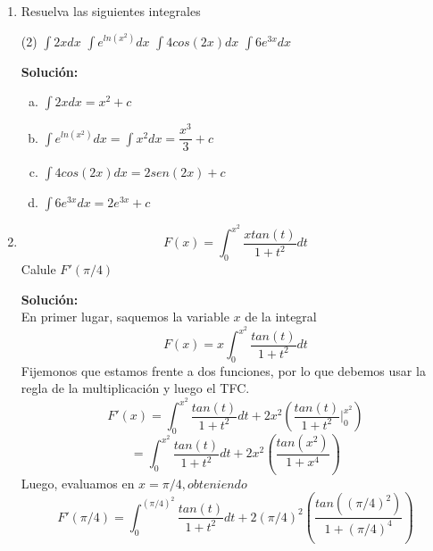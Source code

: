 \documentclass[12pt]{article}
\newenvironment{solucion}
{\begin{mdframed}[backgroundcolor=black!10]
		{\bf Solución:}\\
	}
	{
	\end{mdframed}
}
\newenvironment{preguntas}
{\begin{enumerate}\itemsep12pt
	}
	{
	\end{enumerate}
}
\newcommand{\ev}{\Big|}
\begin{document}
\begin{preguntas}
\begin{solucion}
\end{solucion}
\item Resuelva las siguientes integrales
\begin{tasks}(2)
\task $\displaystyle\int 2xdx$
\task $\displaystyle\int e^{ln(x^2)}dx$
\task $\displaystyle\int 4cos(2x)dx$
\task $\displaystyle\int 6e^{3x}dx$
\end{tasks}
\begin{solucion}

\begin{enumerate}[a)]
\item $\displaystyle\int 2xdx = x^2 + c$
\item $\displaystyle\int e^{ln(x^2)}dx = \displaystyle\int x^2dx = \dfrac{x^3}{3} + c$
\item $\displaystyle\int 4cos(2x)dx = 2sen(2x) + c$
\item $\displaystyle\int 6e^{3x}dx = 2e^{3x} + c$
\end{enumerate}
\end{solucion}
\item $$F(x) = \displaystyle\int_0^{x^2} \dfrac{xtan(t)}{1+t^2}dt$$
	Calule $F'(\pi /4)$
\begin{solucion}
En primer lugar, saquemos la variable $x$ de la integral
		$$F(x) = x\displaystyle\int_0^{x^2} \dfrac{tan(t)}{1+t^2}dt$$
		Fijemonos que estamos frente a dos funciones, por lo que debemos usar la regla de la multiplicación y luego el TFC.
		$$F'(x) = \displaystyle\int_0^{x^2} \dfrac{tan(t)}{1+t^2}dt + 2x^2\left(\dfrac{tan(t)}{1+t^2}\ev_0^{x^2}\right)$$
		$$= \displaystyle\int_0^{x^2} \dfrac{tan(t)}{1+t^2}dt + 2x^2\left(\dfrac{tan(x^2)}{1+x^4}\right)$$
		Luego, evaluamos en $x = \pi /4, obteniendo$
		$$F'(\pi /4) = \displaystyle\int_0^{(\pi /4)^2} \dfrac{tan(t)}{1+t^2}dt + 2(\pi /4)^2\left(\dfrac{tan((\pi /4)^2)}{1+(\pi /4)^4}\right)$$
\end{solucion}
\end{preguntas}
\end{document}
